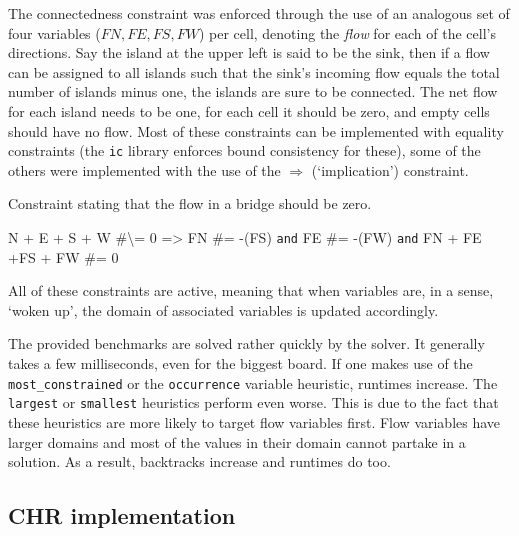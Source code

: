 The connectedness constraint was enforced through the use of an analogous set of four variables ($FN,FE,FS,FW$) per cell, denoting the \textit{flow} for each of the cell's directions. Say the island at the upper left is said to be the sink, then if a flow can be assigned to all islands such that the sink's incoming flow equals the total number of islands minus one, the islands are sure to be connected. The net flow for each island needs to be one, for each cell it should be zero, and empty cells should have no flow. Most of these constraints can be implemented with equality constraints (the \texttt{ic} library enforces bound consistency for these), some of the others were implemented with the use of the \href{http://eclipseclp.org/doc/bips/lib/ic/EG-2.html}{$\Rightarrow$} (`implication') constraint.\\\par

\begin{snippet}[H]
\caption{Constraint stating that the flow in a bridge should be zero.}\label{hashi}
\small
N + E + S + W \#\textbackslash= 0 => FN \#= -(FS) \texttt{and} FE \#= -(FW) \texttt{and} FN + FE +FS + FW \#= 0
\end{snippet}

All of these constraints are active, meaning that when variables are, in a sense, `woken up', the domain of associated variables is updated accordingly.\\\par

The provided benchmarks are solved rather quickly by the solver. It generally takes a few milliseconds, even for the biggest board. If one makes use of the \texttt{most\_constrained} or the \texttt{occurrence} variable heuristic, runtimes increase. The \texttt{largest} or \texttt{smallest} heuristics perform even worse. This is due to the fact that these heuristics are more likely to target flow variables first. Flow variables have larger domains and most of the values in their domain cannot partake in a solution. As a result, backtracks increase and runtimes do too.

\subsection{CHR implementation}


